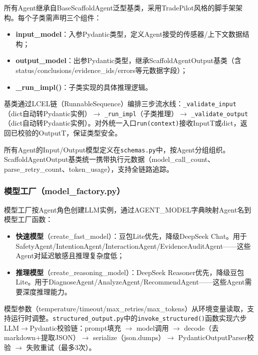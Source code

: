 \documentclass[a4paper]{article}
\begin{document}
所有Agent继承自BaseScaffoldAgent泛型基类，采用TradePilot风格的脚手架架构。每个子类需声明三个组件：

\begin{itemize}
    \item \textbf{input\_model}：入参Pydantic类型，定义Agent接受的传感器/上下文数据结构；
    \item \textbf{output\_model}：出参Pydantic类型，继承ScaffoldAgentOutput基类（含status/conclusions/evidence\_ids/errors等元数据字段）；
    \item \textbf{\_run\_impl()}：子类实现的具体推理逻辑。
\end{itemize}

基类通过LCEL链（RunnableSequence）编排三步流水线：\texttt{\_validate\_input}（dict自动转Pydantic实例）$\rightarrow$ \texttt{\_run\_impl}（子类推理）$\rightarrow$ \texttt{\_validate\_output}（dict自动转Pydantic实例）。对外统一入口\texttt{run(context)}接收InputT或dict，返回已校验的OutputT，保证类型安全。

所有Agent的Input/Output模型定义在\texttt{schemas.py}中，按Agent分组组织。ScaffoldAgentOutput基类统一携带执行元数据（model\_call\_count、parse\_retry\_count、token\_usage），支持全链路追踪。

\subsubsection{模型工厂（model\_factory.py）}

模型工厂按Agent角色创建LLM实例，通过AGENT\_MODEL字典映射Agent名到模型工厂函数：

\begin{itemize}
    \item \textbf{快速模型}（create\_fast\_model）：豆包Lite优先，降级DeepSeek Chat。用于SafetyAgent/IntentionAgent/InteractionAgent/EvidenceAuditAgent——这些Agent对延迟敏感且推理复杂度低；
    \item \textbf{推理模型}（create\_reasoning\_model）：DeepSeek Reasoner优先，降级豆包Lite。用于DiagnoseAgent/AnalyzeAgent/RecommendAgent——这些Agent需要深度推理能力。
\end{itemize}

模型参数（temperature/timeout/max\_retries/max\_tokens）从环境变量读取，支持运行时调整。\texttt{structured\_output.py}中的\texttt{invoke\_structured()}函数实现六步LLM$\rightarrow$Pydantic校验链：prompt填充 $\rightarrow$ model调用 $\rightarrow$ decode（去markdown+提取JSON）$\rightarrow$ serialize（json.dumps）$\rightarrow$ PydanticOutputParser校验 $\rightarrow$ 失败重试（最多3次）。
\end{document}
